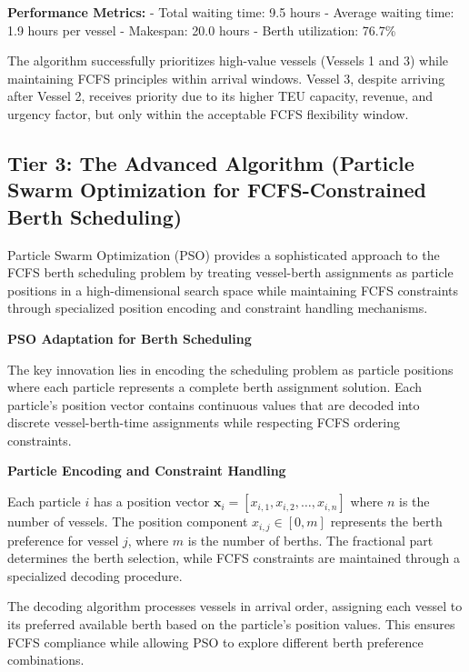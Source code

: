 \documentclass{article}
\begin{document}
\textbf{Performance Metrics:}
- Total waiting time: 9.5 hours
- Average waiting time: 1.9 hours per vessel
- Makespan: 20.0 hours
- Berth utilization: 76.7\%

The algorithm successfully prioritizes high-value vessels (Vessels 1 and 3) while maintaining FCFS principles within arrival windows. Vessel 3, despite arriving after Vessel 2, receives priority due to its higher TEU capacity, revenue, and urgency factor, but only within the acceptable FCFS flexibility window.

\subsection{Tier 3: The Advanced Algorithm (Particle Swarm Optimization for FCFS-Constrained Berth Scheduling)}

Particle Swarm Optimization (PSO) provides a sophisticated approach to the FCFS berth scheduling problem by treating vessel-berth assignments as particle positions in a high-dimensional search space while maintaining FCFS constraints through specialized position encoding and constraint handling mechanisms.

\textbf{PSO Adaptation for Berth Scheduling}

The key innovation lies in encoding the scheduling problem as particle positions where each particle represents a complete berth assignment solution. Each particle's position vector contains continuous values that are decoded into discrete vessel-berth-time assignments while respecting FCFS ordering constraints.

\textbf{Particle Encoding and Constraint Handling}

Each particle $i$ has a position vector $\mathbf{x}_i = [x_{i,1}, x_{i,2}, \ldots, x_{i,n}]$ where $n$ is the number of vessels. The position component $x_{i,j} \in [0, m]$ represents the berth preference for vessel $j$, where $m$ is the number of berths. The fractional part determines the berth selection, while FCFS constraints are maintained through a specialized decoding procedure.

The decoding algorithm processes vessels in arrival order, assigning each vessel to its preferred available berth based on the particle's position values. This ensures FCFS compliance while allowing PSO to explore different berth preference combinations.


\end{document}
